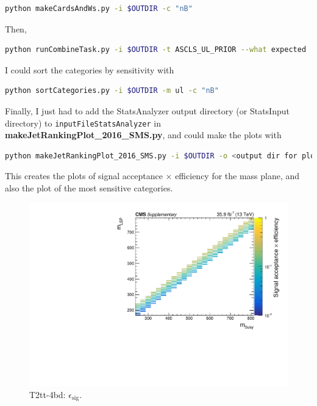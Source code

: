 \begin{lstlisting}[belowskip=-0.7cm, language=sh, numbers=none]
python makeCardsAndWs.py -i $OUTDIR -c "nB"
\end{lstlisting}

Then,

\begin{lstlisting}[belowskip=-0.7cm, language=sh, numbers=none]
python runCombineTask.py -i $OUTDIR -t ASCLS_UL_PRIOR --what expected
\end{lstlisting}

I could sort the \njet categories by sensitivity with

\begin{lstlisting}[belowskip=-0.7cm, language=sh, numbers=none]
python sortCategories.py -i $OUTDIR -m ul -c "nB"
\end{lstlisting}

Finally, I just had to add the StatsAnalyzer output directory (or StatsInput directory) to \texttt{inputFileStatsAnalyzer} in \textbf{makeJetRankingPlot\_2016\_SMS.py}, and could make the plots with

\begin{lstlisting}[belowskip=-0.7cm, language=sh, numbers=none]
python makeJetRankingPlot_2016_SMS.py -i $OUTDIR -o <output dir for plots>
\end{lstlisting}

This creates the plots of signal acceptance $\times$ efficiency for the mass plane, and also the plot of the most sensitive \njet categories. 

\begin{figure}[htbp]
\centering
\includegraphics[width=120mm]{./sec31/T2tt_sig_acc_eff.pdf}
\caption{T2tt-4bd: $\epsilon_{\mathrm{sig}}$.}
\end{figure}

